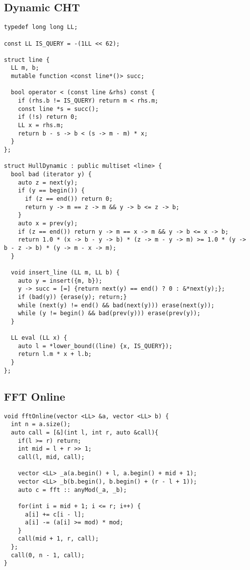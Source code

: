 \documentclass[FSZ,a4paper,onesided]{article}
\begin{document}
\begin{multicols*}{\COLS}
\subsection{Dynamic CHT}
\begin{lstlisting}
typedef long long LL;

const LL IS_QUERY = -(1LL << 62);

struct line {
  LL m, b;
  mutable function <const line*()> succ;

  bool operator < (const line &rhs) const {
    if (rhs.b != IS_QUERY) return m < rhs.m;
    const line *s = succ();
    if (!s) return 0;
    LL x = rhs.m;
    return b - s -> b < (s -> m - m) * x;
  }
};

struct HullDynamic : public multiset <line> { 
  bool bad (iterator y) {
    auto z = next(y);
    if (y == begin()) {
      if (z == end()) return 0;
      return y -> m == z -> m && y -> b <= z -> b;
    }
    auto x = prev(y);
    if (z == end()) return y -> m == x -> m && y -> b <= x -> b;
    return 1.0 * (x -> b - y -> b) * (z -> m - y -> m) >= 1.0 * (y -> b - z -> b) * (y -> m - x -> m);
  }

  void insert_line (LL m, LL b) {
    auto y = insert({m, b});
    y -> succ = [=] {return next(y) == end() ? 0 : &*next(y);};
    if (bad(y)) {erase(y); return;}
    while (next(y) != end() && bad(next(y))) erase(next(y));
    while (y != begin() && bad(prev(y))) erase(prev(y));
  }

  LL eval (LL x) {
    auto l = *lower_bound((line) {x, IS_QUERY});
    return l.m * x + l.b;
  }
};
\end{lstlisting}
\subsection{FFT Online}
\begin{lstlisting}
void fftOnline(vector <LL> &a, vector <LL> b) {
  int n = a.size();
  auto call = [&](int l, int r, auto &call){
    if(l >= r) return;
    int mid = l + r >> 1;
    call(l, mid, call);

    vector <LL> _a(a.begin() + l, a.begin() + mid + 1);
    vector <LL> _b(b.begin(), b.begin() + (r - l + 1));
    auto c = fft :: anyMod(_a, _b);

    for(int i = mid + 1; i <= r; i++) {
      a[i] += c[i - l];
      a[i] -= (a[i] >= mod) * mod;
    }
    call(mid + 1, r, call);
  };
  call(0, n - 1, call);
}

\end{lstlisting}

\end{multicols*}
\end{document}
